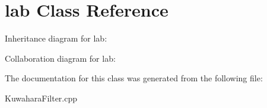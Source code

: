 \hypertarget{classlab}{\section{lab Class Reference}
\label{classlab}
}


Inheritance diagram for lab\-:


Collaboration diagram for lab\-:


The documentation for this class was generated from the following file\-:\begin{DoxyCompactItemize}
\item 
Kuwahara\-Filter.\-cpp\end{DoxyCompactItemize}
